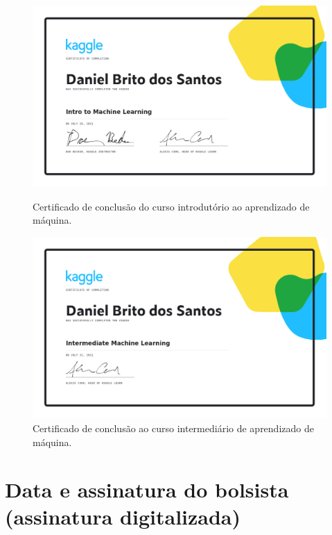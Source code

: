 \documentclass{article}
\begin{document}
\begin{figure}[h!tbp]
  \centering
  \begin{minipage}[b]{0.7\textwidth}
    \includegraphics[width=\textwidth]{Figures/Daniel Brito dos Santos - Intro to Machine Learning.png}
    \caption{\label{intro} Certificado de conclusão do curso introdutório ao aprendizado de máquina.}
  \end{minipage}
  \hfill
  \begin{minipage}[b]{0.7\textwidth}
    \includegraphics[width=\textwidth]{Figures/Daniel Brito dos Santos - Intermediate Machine Learning.png}
    \caption{\label{intermediate} Certificado de conclusão ao curso intermediário de aprendizado de máquina.}
  \end{minipage}
\end{figure}

\section{Data e assinatura do bolsista (assinatura digitalizada)}
\end{document}
